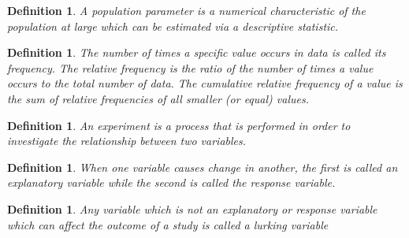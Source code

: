 \documentclass[1pt]{report}
\newtheorem{defn}[thm]{Definition}
\newcommand{\<}{\langle}
\renewcommand{\>}{\rangle}
\begin{document}
\begin{defn}\label{def:parameter}
A \emph{population parameter} is a numerical characteristic of the population at large which can be estimated via a descriptive statistic.
\end{defn}
\begin{defn}\label{def:frequency}
The number of times a specific value occurs in data is called its \emph{frequency}. The \emph{relative frequency} is the ratio of the number of times a value occurs to the total number of data. The \emph{cumulative relative frequency} of a value is the sum of relative frequencies of all smaller (or equal) values.
\end{defn}
\begin{defn}\label{def:experiment}
An \emph{experiment} is a process that is performed in order to investigate the relationship between two variables. 
\end{defn}
\begin{defn}\label{def:explanatoryresponse}
When one variable  causes change in another, the first is called an \emph{explanatory variable} while the second is called the \emph{response variable}.
\end{defn}
\begin{defn}\label{def:lurking variables}
Any variable which is not an explanatory or response variable which can affect the outcome of a study is called a \emph{lurking variable}
\end{defn}
\end{document}
